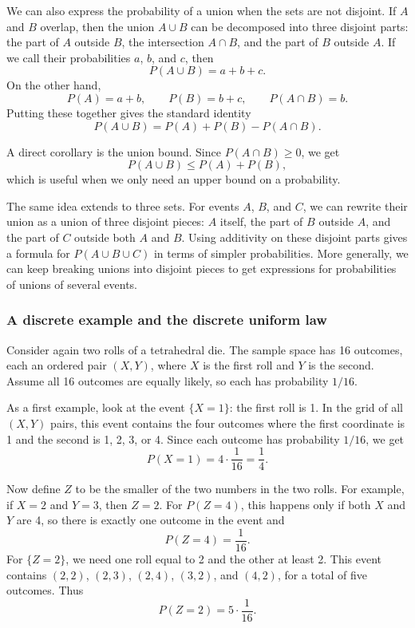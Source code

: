 We can also express the probability of a union when the sets are not disjoint. If \(A\) and \(B\) overlap, then the union \(A \cup B\) can be decomposed into three disjoint parts: the part of \(A\) outside \(B\), the intersection \(A \cap B\), and the part of \(B\) outside \(A\). If we call their probabilities \(a\), \(b\), and \(c\), then
\[
P(A \cup B) = a + b + c.
\]
On the other hand,
\[
P(A) = a + b, \qquad P(B) = b + c, \qquad P(A \cap B) = b.
\]
Putting these together gives the standard identity
\[
P(A \cup B) = P(A) + P(B) - P(A \cap B).
\]

A direct corollary is the union bound. Since \(P(A \cap B) \ge 0\), we get
\[
P(A \cup B) \le P(A) + P(B),
\]
which is useful when we only need an upper bound on a probability.

The same idea extends to three sets. For events \(A\), \(B\), and \(C\), we can rewrite their union as a union of three disjoint pieces: \(A\) itself, the part of \(B\) outside \(A\), and the part of \(C\) outside both \(A\) and \(B\). Using additivity on these disjoint parts gives a formula for \(P(A \cup B \cup C)\) in terms of simpler probabilities. More generally, we can keep breaking unions into disjoint pieces to get expressions for probabilities of unions of several events.

\subsubsection{A discrete example and the discrete uniform law}

Consider again two rolls of a tetrahedral die. The sample space has 16 outcomes, each an ordered pair \((X,Y)\), where \(X\) is the first roll and \(Y\) is the second. Assume all 16 outcomes are equally likely, so each has probability \(1/16\).

As a first example, look at the event \(\{X = 1\}\): the first roll is 1. In the grid of all \((X,Y)\) pairs, this event contains the four outcomes where the first coordinate is 1 and the second is 1, 2, 3, or 4. Since each outcome has probability \(1/16\), we get
\[
P(X = 1) = 4 \cdot \frac{1}{16} = \frac{1}{4}.
\]

Now define \(Z\) to be the smaller of the two numbers in the two rolls. For example, if \(X = 2\) and \(Y = 3\), then \(Z = 2\). For \(P(Z = 4)\), this happens only if both \(X\) and \(Y\) are 4, so there is exactly one outcome in the event and
\[
P(Z = 4) = \frac{1}{16}.
\]
For \(\{Z = 2\}\), we need one roll equal to 2 and the other at least 2. This event contains \((2,2)\), \((2,3)\), \((2,4)\), \((3,2)\), and \((4,2)\), for a total of five outcomes. Thus
\[
P(Z = 2) = 5 \cdot \frac{1}{16}.
\]

